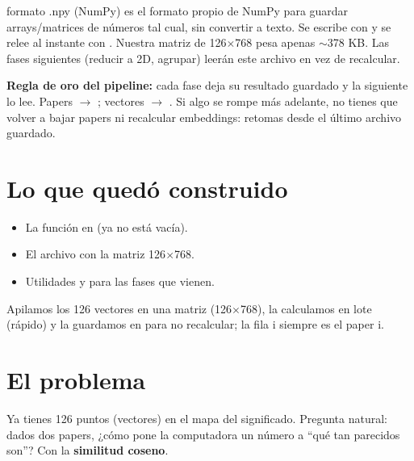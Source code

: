 \documentclass[11pt,a4paper]{article}
\begin{document}
\begin{concepto}{formato .npy (NumPy)}
 es el formato propio de NumPy para guardar arrays/matrices de números tal
cual, sin convertir a texto. Se escribe con  y se relee al instante con
. Nuestra matriz de 126$\times$768 pesa apenas $\sim$378 KB. Las fases
siguientes (reducir a 2D, agrupar) leerán este archivo en vez de recalcular.
\end{concepto}

\begin{ojo}
\textbf{Regla de oro del pipeline:} cada fase deja su resultado guardado y la siguiente lo
lee. Papers $\rightarrow$ ; vectores $\rightarrow$ .
Si algo se rompe más adelante, no tienes que volver a bajar papers ni recalcular embeddings:
retomas desde el último archivo guardado.
\end{ojo}

\section{Lo que quedó construido}

\begin{itemize}
  \item La función  en  (ya no está vacía).
  \item El archivo  con la matriz 126$\times$768.
  \item Utilidades  y  para las
        fases que vienen.
\end{itemize}

\begin{resumen}
Apilamos los 126 vectores en una matriz (126$\times$768), la calculamos en lote (rápido) y la
guardamos en  para no recalcular; la fila i siempre es el paper i.
\end{resumen}
\clearpage
{}
{}

\section{El problema}

Ya tienes 126 puntos (vectores) en el mapa del significado. Pregunta natural: dados dos
papers, ¿cómo pone la computadora un número a ``qué tan parecidos son''? Con la
\textbf{similitud coseno}.
\end{document}
